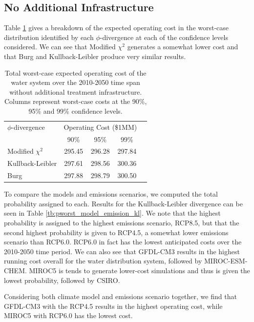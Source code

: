 \documentclass[11pt]{article}
\theoremstyle{plain}
\theoremstyle{definition}
\theoremstyle{remark}
\begin{document}
\subsection{No Additional Infrastructure}

Table \ref{tb:total_cost_no_infrastructure} gives a breakdown of the expected operating cost in the worst-case distribution identified by each $\phi$-divergence at each of the confidence levels considered.
We can see that Modified $\chi^2$ generates a somewhat lower cost and that Burg and Kullback-Leibler produce very similar results.

\begin{table}
	\centering
	\begin{tabular}{l|cccc}
		$\phi$-divergence & \multicolumn{3}{c}{Operating Cost (\$1MM)} \\
								& 90\%   & 95\%   & 99\% \\
		\hline
		Modified $\chi^2$ & 295.45 & 296.28 & 297.84 \\
		Kullback-Leibler  & 297.61 & 298.56 & 300.36 \\
		Burg              & 297.88 & 298.79 & 300.50
	\end{tabular}
	\caption{
		Total worst-case expected operating cost of the water system over the 2010-2050 time span without additional treatment infrastructure.
		Columns represent worst-case costs at the 90\%, 95\% and 99\% confidence levels.
	}
	\label{tb:total_cost_no_infrastructure}
\end{table}

To compare the models and emissions scenarios, we computed the total probability assigned to each.
Results for the Kullback-Leibler divergence can be seen in Table \ref{tb:pworst_model_emission_kl}.
We note that the highest probability is assigned to the highest emissions scenario, RCP8.5, but that the second highest probability is given to RCP4.5, a somewhat lower emissions scenario than RCP6.0.
RCP6.0 in fact has the lowest anticipated costs over the 2010-2050 time period.
We can also see that GFDL-CM3 results in the highest running cost overall for the water distribution system, followed by MIROC-ESM-CHEM.
MIROC5 is tends to generate lower-cost simulations and thus is given the lowest probability, followed by CSIRO.

Considering both climate model and emissions scenario together, we find that GFDL-CM3 with the RCP4.5 results in the highest operating cost, while MIROC5 with RCP6.0 has the lowest cost.
\end{document}
